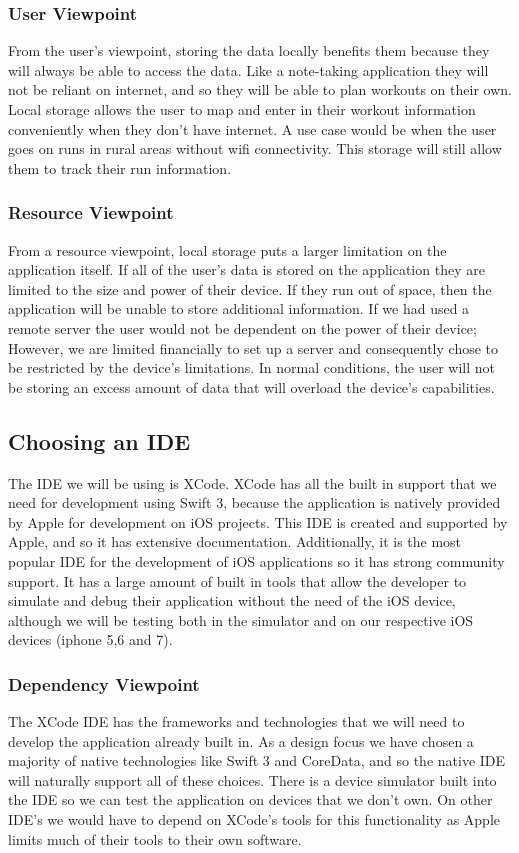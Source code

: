 \documentclass[letterpaper,10pt,titlepage]{article}
\begin{document}
\subsubsection{User Viewpoint}
From the user’s viewpoint, storing the data locally benefits them because they will always be able to access the data. Like a note-taking application they will not be reliant on internet, and so they will be able to plan workouts on their own. Local storage allows the user to map and enter in their workout information conveniently when they don’t have internet. A use case would be when the user goes on runs in rural areas without wifi connectivity. This storage will still allow them to track their run information.

\subsubsection{Resource Viewpoint}
From a resource viewpoint, local storage puts a larger limitation on the application itself. If all of the user’s data is stored on the application they are limited to the size and power of their device. If they run out of space, then the application will be unable to store additional information. If we had used a remote server the user would not be dependent on the power of their device; However, we are limited financially to set up a server and consequently chose to be restricted by the device’s limitations. In normal conditions, the user will not be storing an excess amount of data that will overload the device’s capabilities.


\subsection{Choosing an IDE}
The IDE we will be using is XCode. XCode has all the built in support that we need for development using Swift 3, because the application is natively provided by Apple for development on iOS projects. This IDE is created and supported by Apple, and so it has extensive documentation. Additionally, it is the most popular IDE for the development of iOS applications so it has strong community support. It has a large amount of built in tools that allow the developer to simulate and debug their application without the need of the iOS device, although we will be testing both in the simulator and on our respective iOS devices (iphone 5,6 and 7).

\subsubsection{Dependency Viewpoint}
The XCode IDE has the frameworks and technologies that we will need to develop the application already built in. As a design focus we have chosen a majority of native technologies like Swift 3 and CoreData, and so the native IDE will naturally support all of these choices. There is a device simulator built into the IDE so we can test the application on devices that we don’t own. On other IDE’s we would have to depend on XCode’s tools for this functionality as Apple limits much of their tools to their own software.
\end{document}
